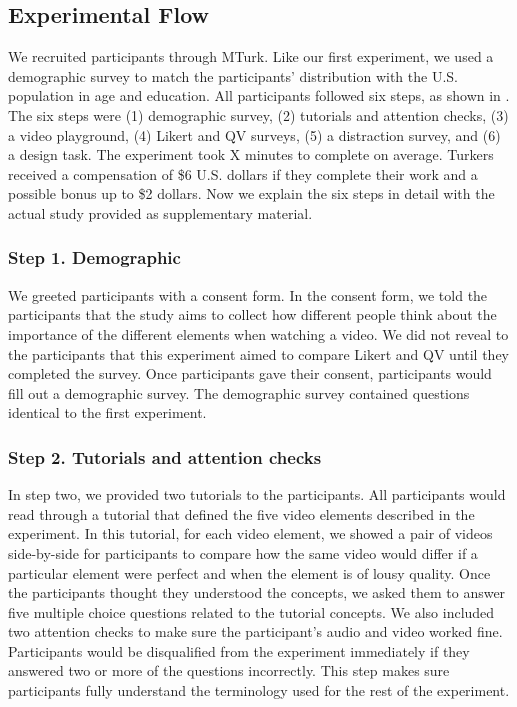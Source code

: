 \subsection{Experimental Flow}

We recruited participants through MTurk. Like our first experiment, we used a demographic survey to match the participants' distribution with the U.S. population in age and education. All participants followed six steps, as shown in . The six steps were (1) demographic survey, (2) tutorials and attention checks, (3) a video playground, (4) Likert and QV surveys, (5) a distraction survey, and (6) a design task. The experiment took X minutes to complete on average. Turkers received a compensation of \$6 U.S. dollars if they complete their work and a possible bonus up to \$2 dollars. Now we explain the six steps in detail with the actual study provided as supplementary material.

\subsubsection{Step 1. Demographic}
We greeted participants with a consent form. In the consent form, we told the participants that the study aims to collect how different people think about the importance of the different elements when watching a video. We did not reveal to the participants that this experiment aimed to compare Likert and QV until they completed the survey. Once participants gave their consent, participants would fill out a demographic survey. The demographic survey contained questions identical to the first experiment.

\subsubsection{Step 2. Tutorials and attention checks}
In step two, we provided two tutorials to the participants. All participants would read through a tutorial that defined the five video elements described in the experiment. In this tutorial, for each video element, we showed a pair of videos side-by-side for participants to compare how the same video would differ if a particular element were perfect and when the element is of lousy quality. Once the participants thought they understood the concepts, we asked them to answer five multiple choice questions related to the tutorial concepts. We also included two attention checks to make sure the participant's audio and video worked fine. Participants would be disqualified from the experiment immediately if they answered two or more of the questions incorrectly. This step makes sure participants fully understand the terminology used for the rest of the experiment.

